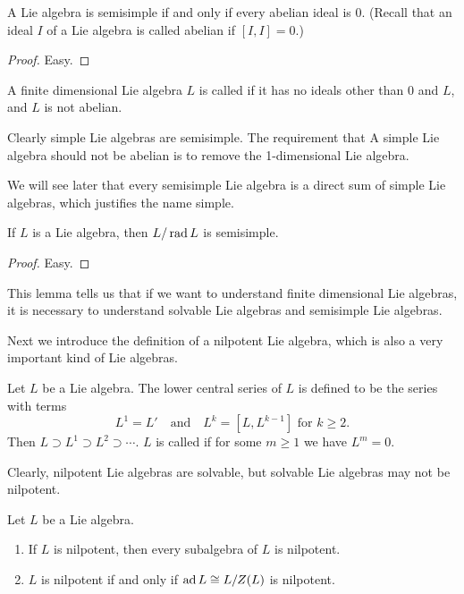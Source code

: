 \begin{prop}
    A Lie algebra is semisimple if and only if every abelian ideal is 0. (Recall that an ideal $I$ of a Lie algebra is called abelian if $[I,I]=0$.)
\end{prop}

\begin{proof}
    Easy.
\end{proof}

\begin{defn}
    A finite dimensional Lie algebra $L$ is called  if it has no ideals other than 0 and $L$, and $L$ is not abelian.
\end{defn}

\begin{rem}
    Clearly simple Lie algebras are semisimple. The requirement that A simple Lie algebra should not be abelian is to remove the 1-dimensional Lie algebra.
\end{rem}

We will see later that every semisimple Lie algebra is a direct sum of simple Lie algebras, which justifies the name simple.

\begin{lem}
    If $L$ is a Lie algebra, then $L/\operatorname{rad} L$ is semisimple.
\end{lem}

\begin{proof}
    Easy.
\end{proof}

This lemma tells us that if we want to understand finite dimensional Lie algebras, it is necessary to understand solvable Lie algebras and semisimple Lie algebras.

Next we introduce the definition of a nilpotent Lie algebra, which is also a very important kind of Lie algebras.

\begin{defn}
    Let $L$ be a Lie algebra. The lower central series of $L$ is defined to be the series with terms 
    \[
        L^{1}=L' \quad \mbox{and} \quad L^{k}=[L,L^{k-1}] \mbox{ for } k\geq 2.
    \]
    Then $L\supset L^{1}\supset L^{2}\supset\cdots$. $L$ is called  if for some $m\geq 1$ we have $L^m=0$.
\end{defn}

Clearly, nilpotent Lie algebras are solvable, but solvable Lie algebras may not be nilpotent.

\begin{prop}\label{adL_nilpotent_iff_L_is}
    Let $L$ be a Lie algebra.
    \begin{enumerate}
        \item If $L$ is nilpotent, then every subalgebra of $L$ is nilpotent.
        \item $L$ is nilpotent if and only if $\operatorname{ad} L\cong L/Z(L)$ is nilpotent.
    \end{enumerate}
\end{prop}

